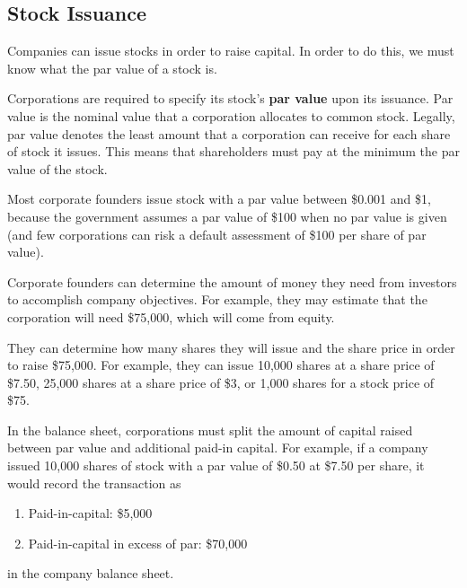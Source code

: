 \documentclass{article}
\begin{document}
  \subsection{Stock Issuance}

    Companies can issue stocks in order to raise capital. In order to do this, we must know what the par value of a stock is. 

    \begin{definition}
      Corporations are required to specify its stock's \textbf{par value} upon its issuance. Par value is the nominal value that a corporation allocates to common stock. Legally, par value denotes the least amount that a corporation can receive for each share of stock it issues. This means that shareholders must pay at the minimum the par value of the stock. 

      Most corporate founders issue stock with a par value between \$0.001 and \$1, because the government assumes a par value of \$100 when no par value is given (and few corporations can risk a default assessment of \$100 per share of par value). 
    \end{definition}

    \begin{definition}
      Corporate founders can determine the amount of money they need from investors to accomplish company objectives. For example, they may estimate that the corporation will need \$75,000, which will come from equity. 

      They can determine how many shares they will issue and the share price in order to raise \$75,000. For example, they can issue 10,000 shares at a share price of \$7.50, 25,000 shares at a share price of \$3, or 1,000 shares for a stock price of \$75. 
    \end{definition}

    \begin{definition}
      In the balance sheet, corporations must split the amount of capital raised between par value and additional paid-in capital. For example, if a company issued 10,000 shares of stock with a par value of \$0.50 at \$7.50 per share, it would record the transaction as 
      \begin{enumerate}
        \item Paid-in-capital: \$5,000
        \item Paid-in-capital in excess of par: \$70,000
      \end{enumerate}
      in the company balance sheet. 
    \end{definition}
\end{document}
